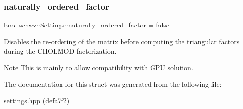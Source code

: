 \subsubsection{\texorpdfstring{naturally\+\_\+ordered\+\_\+factor}{naturally\_ordered\_factor}}
{\footnotesize\ttfamily bool schwz\+::\+Settings\+::naturally\+\_\+ordered\+\_\+factor = false}



Disables the re-\/ordering of the matrix before computing the triangular factors during the C\+H\+O\+L\+M\+OD factorization. 

\begin{DoxyNote}{Note}
This is mainly to allow compatibility with G\+PU solution. 
\end{DoxyNote}


The documentation for this struct was generated from the following file\+:\begin{DoxyCompactItemize}
\item 
settings.\+hpp (defa7f2)\end{DoxyCompactItemize}
